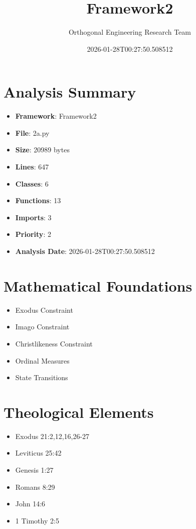 \documentclass[12pt]{article}
\title{Framework2}
\author{Orthogonal Engineering Research Team}
\date{2026-01-28T00:27:50.508512}
\begin{document}
\maketitle

\section{Analysis Summary}

\begin{itemize}
    \item \textbf{Framework}: Framework2
    \item \textbf{File}: 2a.py
    \item \textbf{Size}: 20989 bytes
    \item \textbf{Lines}: 647
    \item \textbf{Classes}: 6
    \item \textbf{Functions}: 13
    \item \textbf{Imports}: 3
    \item \textbf{Priority}: 2
    \item \textbf{Analysis Date}: 2026-01-28T00:27:50.508512
\end{itemize}

\section{Mathematical Foundations}

\begin{itemize}
    \item Exodus Constraint
    \item Imago Constraint
    \item Christlikeness Constraint
    \item Ordinal Measures
    \item State Transitions
\end{itemize}

\section{Theological Elements}

\begin{itemize}
    \item Exodus 21:2,12,16,26-27
    \item Leviticus 25:42
    \item Genesis 1:27
    \item Romans 8:29
    \item John 14:6
    \item 1 Timothy 2:5
\end{itemize}
\end{document}
